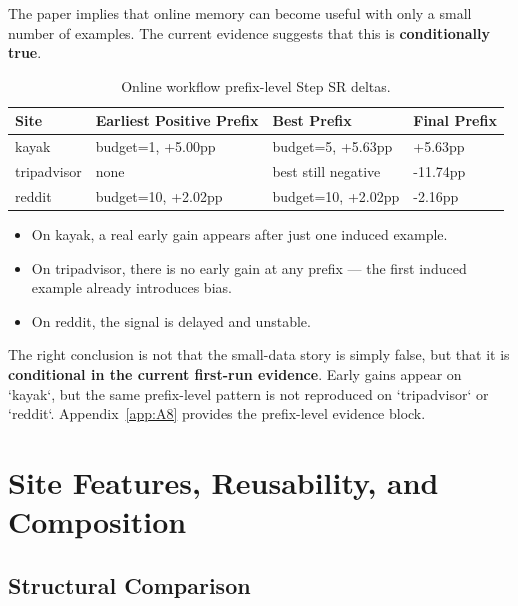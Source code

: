 \documentclass{article}
\providecommand{\tightlist}{%
  \setlength{\itemsep}{0pt}\setlength{\parskip}{0.8em}}
\begin{document}
The paper implies that online memory can become useful with only a small
number of examples. The current evidence suggests that this is
\textbf{conditionally true}.

{\begin{longtable}[]{@{}llll@{}}
\caption{Online workflow prefix-level Step SR deltas.}\label{tab:online-workflow-prefix-level-step-sr-deltas}\\

\toprule\noalign{}
Site & Earliest Positive Prefix & Best Prefix & Final Prefix \\
\midrule\noalign{}
\endhead
\bottomrule\noalign{}
\endlastfoot
kayak & budget=1, +5.00pp & budget=5, +5.63pp & +5.63pp \\
tripadvisor & none & best still negative & -11.74pp \\
reddit & budget=10, +2.02pp & budget=10, +2.02pp & -2.16pp \\
\end{longtable}
}

\begin{itemize}
\tightlist
\item
  On kayak, a real early gain appears after just one induced example.
\item
  On tripadvisor, there is no early gain at any prefix --- the first
  induced example already introduces bias.
\item
  On reddit, the signal is delayed and unstable.
\end{itemize}

The right conclusion is not that the small-data story is simply false,
but that it is \textbf{conditional in the current first-run evidence}.
Early gains appear on `kayak`, but the same prefix-level pattern is not
reproduced on `tripadvisor` or `reddit`. Appendix~\ref{app:A8}
provides the prefix-level evidence block.

\section{Site Features, Reusability, and
Composition}\label{site-features-reusability-and-composition}

\subsection{Structural Comparison}\label{structural-comparison}
\end{document}
